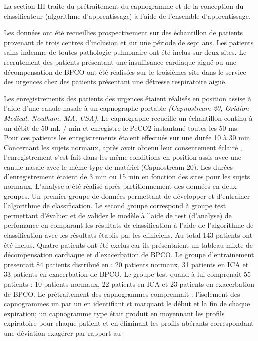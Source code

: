 \documentclass[12pt,]{article}
\begin{document}
La section III traite du prétraitement du capnogramme et de la
conception du classificateur (algorithme d'apprentissage) à l'aide de
l'ensemble d'apprentissage.

Les données ont été recueillies prospectivement sur des échantillon de
patients provenant de trois centres d'inclusion et sur une période de
sept ans. Les patients sains indemne de toutes pathologie pulmonaire ont
été inclus sur deux sites. Le recrutement des patients présentant une
insuffisance cardiaque aiguë ou une décompensation de BPCO ont été
réalisées sur le troisièmes site dans le service des urgences chez des
patients présentant une détresse respiratoire aiguë.

Les enregistrements des patients des urgences étaient réalisés en
position assise à l'aide d'une canule nasale à un capnographe portable
\emph{(Capnostream 20, Oridion Medical, Needham, MA, USA)}. Le
capnographe recueille un échantillon continu à un débit de 50 mL / min
et enregistre le PeCO2 instantané toutes les 50 ms. Pour ces patients
les enregistrements étaient effectués sur une durée 10 à 30 min.
Concernant les sujets normaux, après avoir obtenu leur consentement
éclairé , l'enregistrement s'est fait dans les même conditions en
position assis avec une canule nasale avec le même type de matériel
(Capnostream 20). Les durées d'enregistrement étaient de 3 min ou 15 min
en fonction des sites pour les sujets normaux. L'analyse a été réalisé
après partitionnement des données en deux groupes. Un premier groupe de
données permettant de développer et d'entrainer l'algorithme de
classification. Le second groupe correspond à groupe test permettant
d'évaluer et de valider le modèle à l'aide de test (d'analyse) de
perfomance en comparant les résultats de classification à l'aide de
l'algorithme de classification avec les résultats établis par les
cliniciens. Au total 143 patients ont été inclus. Quatre patients ont
été exclus car ils présentaient un tableau mixte de décompensation
cardiaque et d'exacerbation de BPCO. Le groupe d'entrainement presentait
84 patients distribué en : 20 patients normaux, 31 patients en ICA et 33
patients en exacerbation de BPCO. Le groupe test quand à lui comprenait
55 patients : 10 patients normaux, 22 patients en ICA et 23 patients en
exacerbation de BPCO. Le prétraitement des capnogrammes comprennait :
l'isolement des capnogrammes un par un en identifiant et marquant le
début et la fin de chaque expiration; un capnogramme type était produit
en moyennant les profils expiratoire pour chaque patient et en éliminant
les profils abérants correspondant une déviation exagérer par rapport au
\end{document}
